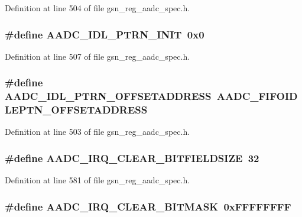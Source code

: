 Definition at line 504 of file gsn\_\-reg\_\-aadc\_\-spec.h.

\hypertarget{a00543_a1ffb605b5787343934c31d6f69cd3ce2}{
\subsubsection[{AADC\_\-IDL\_\-PTRN\_\-INIT}]{\setlength{\rightskip}{0pt plus 5cm}\#define AADC\_\-IDL\_\-PTRN\_\-INIT~0x0}}
\label{a00543_a1ffb605b5787343934c31d6f69cd3ce2}


Definition at line 507 of file gsn\_\-reg\_\-aadc\_\-spec.h.

\hypertarget{a00543_a61b80643c0b2f88aab25279f3cde444a}{
\subsubsection[{AADC\_\-IDL\_\-PTRN\_\-OFFSETADDRESS}]{\setlength{\rightskip}{0pt plus 5cm}\#define AADC\_\-IDL\_\-PTRN\_\-OFFSETADDRESS~AADC\_\-FIFOIDLEPTN\_\-OFFSETADDRESS}}
\label{a00543_a61b80643c0b2f88aab25279f3cde444a}


Definition at line 503 of file gsn\_\-reg\_\-aadc\_\-spec.h.

\hypertarget{a00543_aeda7c5969e31a53cbc263e606b1fc595}{
\subsubsection[{AADC\_\-IRQ\_\-CLEAR\_\-BITFIELDSIZE}]{\setlength{\rightskip}{0pt plus 5cm}\#define AADC\_\-IRQ\_\-CLEAR\_\-BITFIELDSIZE~32}}
\label{a00543_aeda7c5969e31a53cbc263e606b1fc595}


Definition at line 581 of file gsn\_\-reg\_\-aadc\_\-spec.h.

\hypertarget{a00543_ae377e7267f6e12dad91387b2046e8d42}{
\subsubsection[{AADC\_\-IRQ\_\-CLEAR\_\-BITMASK}]{\setlength{\rightskip}{0pt plus 5cm}\#define AADC\_\-IRQ\_\-CLEAR\_\-BITMASK~0xFFFFFFFF}}
\label{a00543_ae377e7267f6e12dad91387b2046e8d42}


